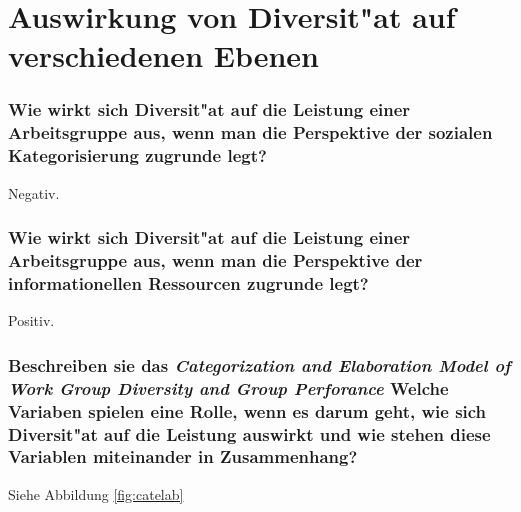 \section{Auswirkung von Diversit"at auf verschiedenen Ebenen}
\subsubsection{Wie wirkt sich Diversit"at auf die Leistung einer Arbeitsgruppe aus, wenn man die Perspektive der sozialen Kategorisierung zugrunde legt?}
Negativ.

\subsubsection{Wie wirkt sich Diversit"at auf die Leistung einer Arbeitsgruppe aus, wenn man die Perspektive der informationellen Ressourcen zugrunde legt?}
Positiv.

\subsubsection{Beschreiben sie das \emph{Categorization and Elaboration Model of Work Group Diversity and Group Perforance} Welche Variaben spielen eine Rolle, wenn es darum geht, wie sich Diversit"at auf die Leistung auswirkt und wie stehen diese Variablen miteinander in Zusammenhang?}
Siehe Abbildung \ref{fig:catelab}

